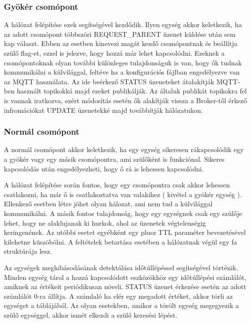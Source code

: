 \subsubsection{Gyökér csomópont}
A hálózat felépítése ezek segítségével kezdődik. Ilyen egység akkor keletkezik, ha az adott csomópont többszöri REQUEST\_PARENT üzenet küldése után sem kap választ. Ebben az esetben kinevezi magát kezdő csomópontnak és beállítja szülő flag-et, ezzel is jelezve, hogy hozzá már lehet kapcsolódni. Ezeknek a csomópontoknak olyan további különleges tulajdonságuk is van, hogy ők tudnak kommunikálni a külvilággal, feltéve ha a konfigurációs fájlban engedélyezve van az MQTT használata. Az ide beérkező STATUS üzeneteket átalakítják MQTT-ben használt topikokká majd ezeket publikálják. Az általuk publikát topikokra fel is vannak iratkozva, ezért módosítás esetén ők alakítják vissza a Broker-től érkező infromációkat UPDATE üzenetekké majd továbbítják hálózatukon.

\subsubsection{Normál csomópont}
A normál csomópont akkor keletkezik, ha egy egység sikeresen rákapcsolódik egy a gyökér vagy egy másik csomópontra, ami szülőként is funkciónal. Sikeres kapcsolódás után engedélyezheti, hogy ő rá is lehessen kapcsolódni.



A hálózat felépítése során fontos, hogy egy csomópontra csak akkor lehessen csatlakozni, ha már ő is csatlakoztatva van valakihez ( kivétel a gyökér egység ). Ellenkező esetben létre jöhet olyan hálozat, ami nem tud a külvilággal kommunikálni. A másik fontos tulajdonság, hogy egy egységnek csak egy szülője lehet, hogy ne alaklujanak ki hurkok, ahol az üzenetek végtelenségig keringenének. Az utóbbi esetet egyébként egy plusz TTL paraméter bevezetésével kilehetne küszöbölni. A feltételek betartása esetében a hálózatnak végül egy fa struktúrája lesz.

Az egységek meghibásodásának detektálása időtúllépéssel segítségével történik. Minden egység tárol a hozzá kapcsolódott eszközökhöz egy időtúllépési számlálót, amiknek az értékeit periódikusan növeli. STATUS üzenet érkezése esetén az adott számlálót 0-ra állítja. A számlaló ha elér egy megadott értéket, akkor törli az egységet a táblájából. Az olyan esetekben, amikor a törölt egység megegyezik a szülő egységgel, akkor ismét elkezdi a szülő keresési lépést.

